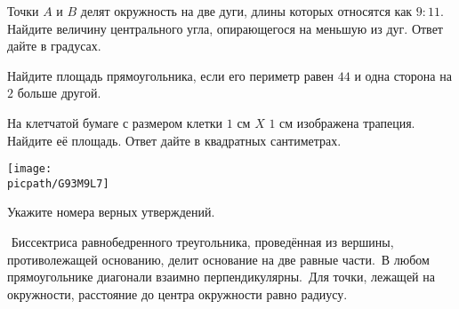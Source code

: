\begin{class}[number=8]
\begin{listofex}
		\item Точки \(A\) и \(B\) делят окружность на две дуги, длины которых относятся как \(9:11\). Найдите величину центрального угла, опирающегося на меньшую из дуг. Ответ дайте в градусах.
		\item Найдите площадь прямоугольника, если его периметр равен \(44\) и одна сторона на \(2\) больше другой.
		\item На клетчатой бумаге с размером клетки \( 1 \) см \( X \) \( 1 \) см изображена трапеция. Найдите её площадь. Ответ дайте в квадратных сантиметрах.
		\begin{center}
			\texttt{[image: \\picpath/G93M9L7]}
		\end{center}
		\item Укажите номера верных утверждений.
		\begin{tasks}
			\task  Биссектриса равнобедренного треугольника, проведённая из вершины, противолежащей основанию, делит основание на две равные части.
			\task В любом прямоугольнике диагонали взаимно перпендикулярны.
			\task Для точки, лежащей на окружности, расстояние до центра окружности равно радиусу.
		\end{tasks}
	\end{listofex}
\end{class}

